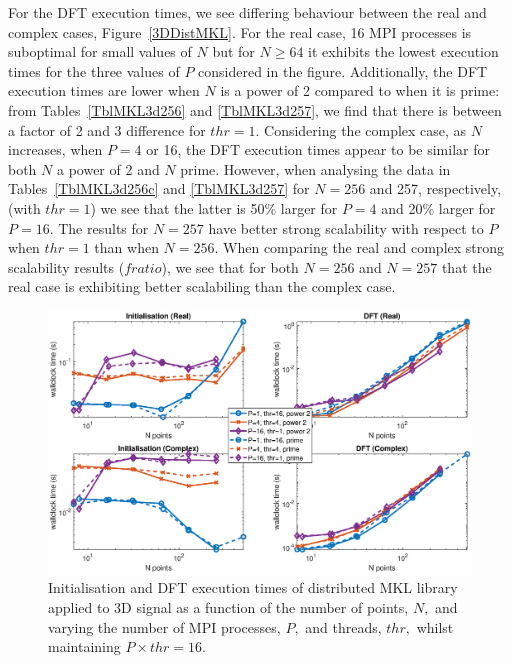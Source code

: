 \documentclass[a4paper]{article}
\begin{document}
For the DFT execution times, we see differing behaviour between the
real and complex cases, Figure~\ref{3DDistMKL}. For the real case, 16
MPI processes is suboptimal for small values of $N$ but for $N\ge 64$
it exhibits the lowest execution times for the three values of $P$
considered in the figure. Additionally, the DFT execution times are
lower when $N$ is a power of 2 compared to when it is prime: from
Tables~\ref{TblMKL3d256} and \ref{TblMKL3d257}, we find that there
is between a factor of 2 and 3 difference for $thr=1.$ Considering the
complex case, as $N$ increases, when $P=4$ or 16, the DFT execution
times appear to be similar for both $N$ a power of 2 and $N$
prime. However, when analysing the data in Tables~\ref{TblMKL3d256c}
and \ref{TblMKL3d257} for $N=256$ and 257, respectively, (with
$thr=1$) we see that the latter is 50\% larger for $P=4$ and 20\%
larger for $P=16.$ The results for $N=257$ have better strong
scalability with respect to $P$ when $thr=1$ than when $N=256.$ When
comparing the real and complex strong scalability results ($fratio$),
we see that for both $N=256$ and $N=257$ that the real case is
exhibiting better scalabiling than the complex case.




\begin{figure}[htb]
    \centering
    \includegraphics[width=0.9\linewidth]{../results/mkl_3d_mpi_thr.eps}
  \caption{Initialisation and DFT execution times of distributed MKL library applied to 3D signal as a function of the
    number of points, $N,$ and varying the number of MPI processes, $P,$ and threads, $thr,$ whilst maintaining $P\times thr=16.$}
  \label{3DDistMKL16}
\end{figure}
\end{document}
